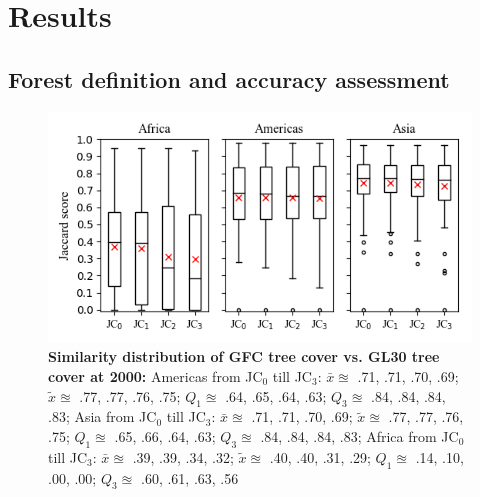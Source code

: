 \chapter{Results}
\label{ch:result}

	\section{Forest definition and accuracy assessment}
	\label{sec:forest_definition}

		\begin{figure}[ht]
			\centering
			\includegraphics[scale=1]{img/jaccard}
			\caption[Similarity distribution of \ac{GFC} tree cover vs. \ac{GL30} tree cover at 200]{\textbf{Similarity distribution of \ac{GFC} tree cover vs. \ac{GL30} tree cover at 2000:} Americas from JC$_0$ till JC$_3$: $\bar{x}\approxeq$ .71, .71, .70, .69; $\tilde{x}\approxeq$ .77, .77, .76, .75; $Q_1\approxeq$ .64, .65, .64, .63; $Q_3\approxeq$ .84, .84, .84, .83; Asia from JC$_0$ till JC$_3$: $\bar{x}\approxeq$ .71, .71, .70, .69; $\tilde{x}\approxeq$ .77, .77, .76, .75; $Q_1\approxeq$ .65, .66, .64, .63; $Q_3\approxeq$ .84, .84, .84, .83; Africa from JC$_0$ till JC$_3$: $\bar{x}\approxeq$ .39, .39, .34, .32; $\tilde{x}\approxeq$ .40, .40, .31, .29; $Q_1\approxeq$ .14, .10, .00, .00; $Q_3\approxeq$ .60, .61, .63, .56}
			\label{fig:jaccard}
		\end{figure}

